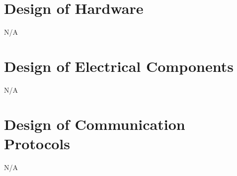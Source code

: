\documentclass[12pt, titlepage]{article}
\begin{document}
\section{Design of Hardware}
N/A


\section{Design of Electrical Components}
N/A


\section{Design of Communication Protocols}
N/A

\newpage
\end{document}
